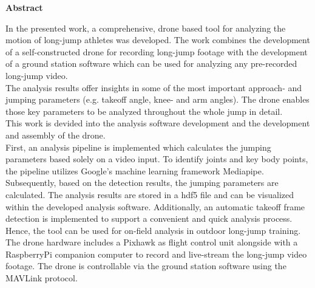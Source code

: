 \thispagestyle{empty}
\vspace*{\fill}
\begin{center}
        \textbf{Abstract}
\end{center}
In the presented work, a comprehensive, drone based tool for analyzing the
motion of long-jump athletes was developed.
The work combines the development of a self-constructed drone for
recording long-jump footage with the development of a ground station software
which can be used for analyzing any pre-recorded long-jump video.\\
The analysis results offer insights in some of the most important approach-
and jumping parameters (e.g. takeoff angle, knee- and arm angles).
The drone enables those key parameters to be analyzed throughout the whole
jump in detail.\\
This work is devided into the analysis software development and the
development and assembly of the drone.\\
First, an analysis pipeline is implemented which calculates the jumping
parameters based solely on a video input.
To identify joints and key body points, the pipeline utilizes Google's
machine learning framework Mediapipe.
Subsequently, based on the detection results, the jumping parameters are
calculated.
The analysis results are stored in a hdf5 file and can be visualized within
the developed analysis software.
Additionally, an automatic takeoff frame detection is implemented to support a
convenient and quick analysis process.
Hence, the tool can be used for on-field analysis in outdoor long-jump
training.\\
The drone hardware includes a Pixhawk as flight control unit alongside with
a RaspberryPi companion computer to record and live-stream the long-jump video
footage.
The drone is controllable via the ground station software using the MAVLink
protocol.\\ 
\vfill

